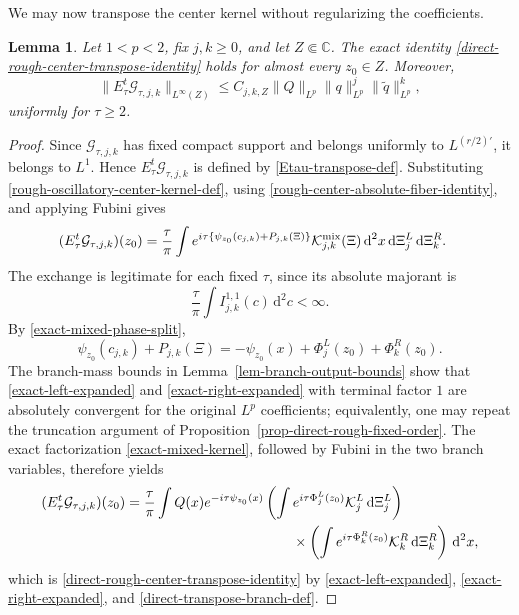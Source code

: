 \documentclass[a4paper,11pt]{article}
\newcommand{\C}{\mathbb{C}}
\newcommand{\dd}{\,\text{d}}
\theoremstyle{plain}
\newtheorem{lem}[thm]{Lemma}
\theoremstyle{definition}
\theoremstyle{remark}
\begin{document}
We may now transpose the center kernel without regularizing the coefficients.

\begin{lem}
\label{lem-direct-rough-center-transpose}
Let $1<p<2$, fix $j,k\geq0$, and let $Z\Subset\C$. The exact identity \eqref{direct-rough-center-transpose-identity} holds for almost every $z_0\in Z$. Moreover,
\begin{equation}\label{direct-rough-center-transpose-Linf}
 \|E_\tau^t\mathcal G_{\tau,j,k}\|_{L^\infty(Z)}
 \leq C_{j,k,Z}
 \|Q\|_{L^p}\|q\|_{L^p}^j
 \|\widetilde q\|_{L^p}^k,
\end{equation}
uniformly for $\tau\geq2$.
\end{lem}

\begin{proof}
Since $\mathcal G_{\tau,j,k}$ has fixed compact support and belongs uniformly to
$L^{(r/2)'}$, it belongs to $L^1$.  Hence $E_\tau^t\mathcal G_{\tau,j,k}$ is defined by
\eqref{Etau-transpose-def}.  Substituting
\eqref{rough-oscillatory-center-kernel-def}, using
\eqref{rough-center-absolute-fiber-identity}, and applying Fubini gives
\begin{align*}
 (E_\tau^t\mathcal G_{\tau,j,k})(z_0)
 &=\frac{\tau}{\pi}
 \int e^{i\tau\{\psi_{z_0}(c_{j,k})+P_{j,k}(\Xi)\}}
 \mathcal K_{j,k}^{\rm mix}(\Xi)
 \dd^2x\dd\Xi_j^L\dd\Xi_k^R.
\end{align*}
The exchange is legitimate for each fixed $\tau$, since its absolute majorant
is
\[
 \frac{\tau}{\pi}\int I_{j,k}^{1,1}(c)\dd^2c<\infty.
\]
By \eqref{exact-mixed-phase-split},
\[
 \psi_{z_0}(c_{j,k})+P_{j,k}(\Xi)
 =-\psi_{z_0}(x)+\Phi_j^L(z_0)+\Phi_k^R(z_0).
\]
The branch-mass bounds in Lemma~\ref{lem-branch-output-bounds} show that
\eqref{exact-left-expanded} and \eqref{exact-right-expanded} with terminal
factor $1$ are absolutely convergent for the original $L^p$ coefficients; equivalently,
one may repeat the truncation argument of
Proposition~\ref{prop-direct-rough-fixed-order}.  The exact factorization
\eqref{exact-mixed-kernel}, followed by Fubini in the two branch variables,
therefore yields
\begin{align*}
 (E_\tau^t\mathcal G_{\tau,j,k})(z_0)
 &=\frac{\tau}{\pi}\int Q(x)e^{-i\tau\psi_{z_0}(x)}
 \left(\int e^{i\tau\Phi_j^L(z_0)}
       \mathcal K_j^L\dd\Xi_j^L\right)\notag\\
 &\hspace{42mm}\times
 \left(\int e^{i\tau\Phi_k^R(z_0)}
       \mathcal K_k^R\dd\Xi_k^R\right)\dd^2x,
\end{align*}
which is \eqref{direct-rough-center-transpose-identity} by
\eqref{exact-left-expanded}, \eqref{exact-right-expanded}, and
\eqref{direct-transpose-branch-def}.


\end{proof}
\end{document}
